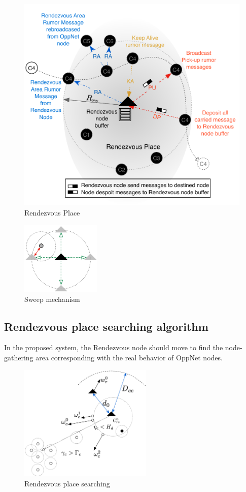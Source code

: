 \begin{figure}[!t]
	\centering
	\includegraphics[width=5in]{Figures/NewRendezvousPlace.pdf}
	\caption{Rendezvous Place}
	\label{Rendezvous Place}
\end{figure}


\begin{figure}[!t]
\centering
\includegraphics[width=1.5in]{Figures/Sweep.pdf}
\caption{Sweep mechanism}
\label{Sweep mechanism}
\end{figure}

\subsection{Rendezvous place searching algorithm}

In the proposed system, the Rendezvous node should move to find the node-gathering area corresponding with the real behavior of OppNet nodes.
%
\begin{figure}[!t]
	\centering
	\includegraphics[width=2.5in]{Figures/Dynamic.pdf}
	\caption{Rendezvous place searching}
	\label{Rendezvous node movements}
\end{figure}

